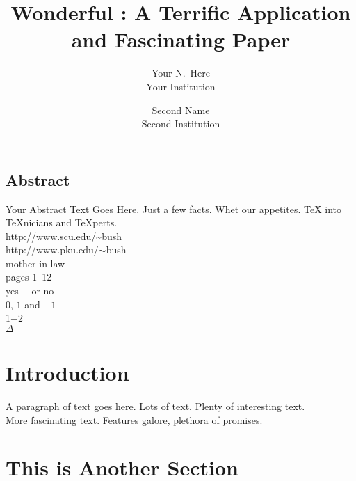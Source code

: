 \documentclass[letterpaper,twocolumn,10pt]{article}
\begin{document}
\date{}

\title{\Large \bf Wonderful : A Terrific Application and Fascinating Paper}

\author{
{\rm Your N.\ Here}\\
Your Institution
\and
{\rm Second Name}\\
Second Institution
} %

\maketitle

\thispagestyle{empty}


\subsection*{Abstract}
Your Abstract Text Goes Here.  Just a few facts.
Whet our appetites.\newline
\TeX{} into \TeX{}nicians and \TeX perts. \\
http://www.scu.edu/\~{}bush \\
http://www.pku.edu/$\sim$bush \\
mother-in-law \\
pages 1--12 \\
yes ---or no \\
$0$, $1$ and $-1$ \\
1$-$2 \\
$\Delta$


\section{Introduction}

A paragraph of text goes here.  Lots of text.  Plenty of interesting
text. \\

More fascinating text. Features galore, plethora of promises.\\

\section{This is Another Section}
\end{document}
